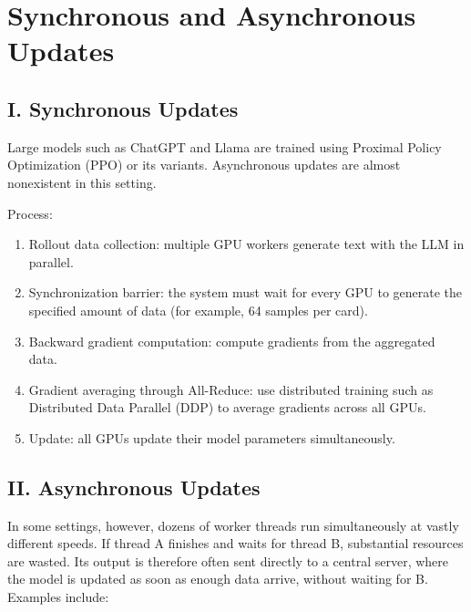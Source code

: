 \setcounter{section}{3}

\hypertarget{synchronous-and-asynchronous-updates}{%
\section{Synchronous and Asynchronous Updates}\label{synchronous-and-asynchronous-updates}}

\hypertarget{i.-synchronous-updates}{%
\subsection{I. Synchronous Updates}\label{i.-synchronous-updates}}

Large models such as ChatGPT and Llama are trained using Proximal Policy Optimization (PPO) or its variants. Asynchronous updates are almost nonexistent in this setting.

Process:

\begin{enumerate}
\def\labelenumi{\arabic{enumi}.}
\tightlist
\item
  Rollout data collection: multiple GPU workers generate text with the LLM in parallel.
\item
  Synchronization barrier: the system must wait for every GPU to generate the specified amount of data (for example, 64 samples per card).
\item
  Backward gradient computation: compute gradients from the aggregated data.
\item
  Gradient averaging through All-Reduce: use distributed training such as Distributed Data Parallel (DDP) to average gradients across all GPUs.
\item
  Update: all GPUs update their model parameters simultaneously.
\end{enumerate}

\hypertarget{ii.-asynchronous-updates}{%
\subsection{II. Asynchronous Updates}\label{ii.-asynchronous-updates}}

In some settings, however, dozens of worker threads run simultaneously at vastly different speeds. If thread A finishes and waits for thread B, substantial resources are wasted. Its output is therefore often sent directly to a central server, where the model is updated as soon as enough data arrive, without waiting for B. Examples include:

